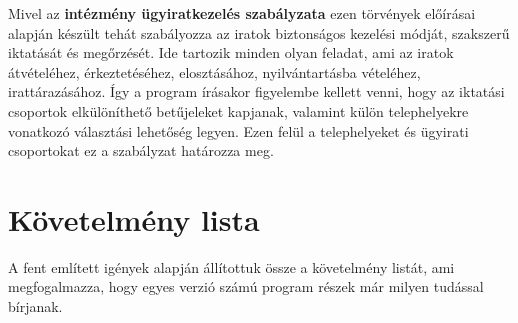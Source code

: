 \documentclass[
]{thesis-ekf}
\theoremstyle{definition}
\theoremstyle{remark}
\begin{document}
Mivel az \textbf{intézmény ügyiratkezelés szabályzata} ezen törvények előírásai alapján készült tehát szabályozza az iratok biztonságos kezelési módját, szakszerű iktatását és megőrzését. Ide tartozik minden olyan feladat, ami az iratok átvételéhez, érkeztetéséhez, elosztásához, nyilvántartásba vételéhez, irattárazásához. Így a program írásakor figyelembe kellett venni, hogy az iktatási csoportok elkülöníthető betűjeleket kapjanak, valamint külön telephelyekre vonatkozó választási lehetőség legyen. Ezen felül a telephelyeket és ügyirati csoportokat ez a szabályzat határozza meg. 

\section{Követelmény lista}
A fent említett igények alapján állítottuk össze a követelmény listát, ami megfogalmazza, hogy egyes verzió számú program részek már milyen tudással bírjanak.
\end{document}
